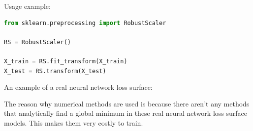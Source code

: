 \par
Usage example:

\begin{lstlisting}[language=Python, caption=Feature scaling]
from sklearn.preprocessing import RobustScaler

RS = RobustScaler()

X_train = RS.fit_transform(X_train)
X_test = RS.transform(X_test)
\end{lstlisting}

An example of a real neural network loss surface:


\par
The reason why numerical methods are used is because there aren't any methods
that analytically find a global minimum in these real neural network loss
surface models. This makes them very costly to train.



